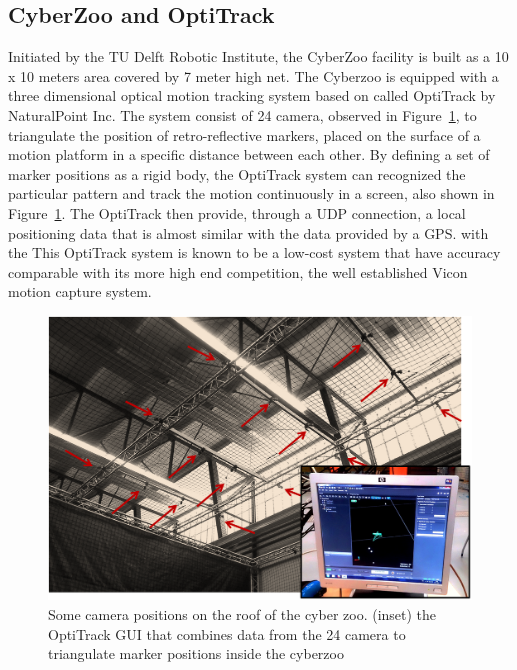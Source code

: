 \subsection{CyberZoo and OptiTrack}
Initiated by the TU Delft Robotic Institute, the CyberZoo facility is built as  a 10 x 10 meters area covered by 7 meter high net. %
The Cyberzoo is equipped with a three dimensional optical motion tracking system based on called OptiTrack by NaturalPoint Inc\cite{Hansen:14}\cite{Guadarrama-Olvera:14}. The system consist of 24 camera, observed in Figure~\ref{f:OptiTrackCyberZoo},  to triangulate the position of retro-reflective markers, placed on the surface of a motion platform in a specific distance between each other. By defining a set of marker positions as a rigid body, the OptiTrack system can recognized the particular pattern and track the motion continuously in a screen, also shown in Figure~\ref{f:OptiTrackCyberZoo}. The OptiTrack then provide, through a UDP connection, a local positioning data that is almost similar with the data provided by a GPS. with the This OptiTrack system is known to be a low-cost system that have accuracy comparable with its more high end competition, the well established Vicon motion capture system\cite{Hansen:14}.


\begin{figure}[h]
\includegraphics[width=0.9\linewidth]{Figures/OptiTrackCyberZoo.png}
\centering
\caption{Some camera positions on the roof of the cyber zoo. (inset) the OptiTrack GUI that combines data from the 24 camera to triangulate marker positions inside the cyberzoo}
\label{f:OptiTrackCyberZoo}
\end{figure}

